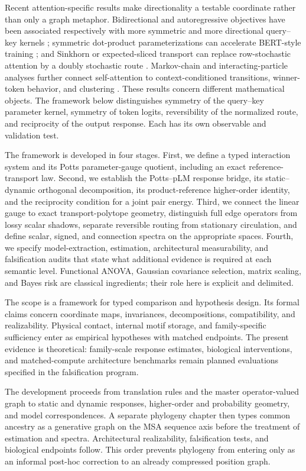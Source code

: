 \documentclass[10pt]{article}
\theoremstyle{definition}
\theoremstyle{remark}
\begin{document}
Recent attention-specific results make directionality a testable coordinate rather than only a
graph metaphor.  Bidirectional and autoregressive objectives have been associated respectively
with more symmetric and more directional query--key kernels \cite{saponati2025}; symmetric
dot-product parameterizations can accelerate BERT-style training \cite{courtois2024}; and
Sinkhorn or expected-sliced transport can replace row-stochastic attention by a doubly stochastic
route \cite{sander2022,shahbazi2025}.  Markov-chain and interacting-particle analyses further connect self-attention to
context-conditioned transitions, winner-token behavior, and clustering
\cite{ildiz2024,geshkovski2023}.  These results concern different mathematical objects.  The
framework below distinguishes symmetry of the query--key parameter kernel, symmetry of token
logits, reversibility of the normalized route, and reciprocity of the output response.  Each has its
own observable and validation test.

The framework is developed in four stages.  First, we define a typed interaction system and its
Potts parameter-gauge quotient, including an exact reference-transport law.  Second, we establish the
Potts--pLM response bridge, its static--dynamic orthogonal decomposition, its product-reference
higher-order identity, and the reciprocity condition for a joint pair energy.  Third, we connect
the linear gauge to exact transport-polytope geometry, distinguish full edge operators from
lossy scalar shadows, separate reversible routing from stationary circulation, and define scalar,
signed, and connection spectra on the appropriate spaces.
Fourth, we specify model-extraction, estimation, architectural
measurability, and falsification audits that state what additional evidence is required at each
semantic level.  Functional ANOVA, Gaussian covariance selection, matrix scaling, and Bayes risk
are classical ingredients; their role here is explicit and delimited.

The scope is a framework for typed comparison and hypothesis design.  Its formal claims concern
coordinate maps, invariances, decompositions, compatibility, and realizability.  Physical contact,
internal motif storage, and family-specific sufficiency enter as empirical hypotheses with matched
endpoints.  The present evidence is theoretical: family-scale response estimates, biological
interventions, and matched-compute architecture benchmarks remain planned evaluations specified in
the falsification program.

The development proceeds from translation rules and the master operator-valued graph to static and
dynamic responses, higher-order and probability geometry, and model correspondences.  A separate
phylogeny chapter then types common ancestry as a generative graph on the MSA sequence axis before
the treatment of estimation and spectra.  Architectural realizability, falsification tests, and
biological endpoints follow.  This order prevents phylogeny from entering only as an informal
post-hoc correction to an already compressed position graph.
\end{document}
